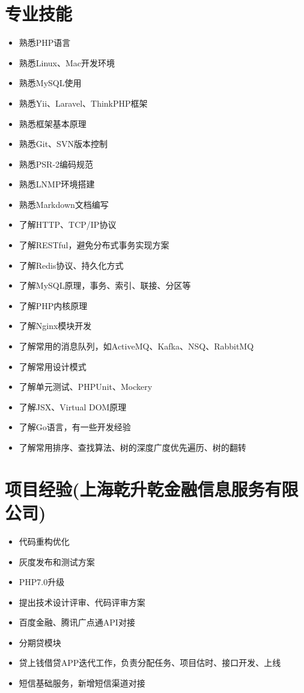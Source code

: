 \documentclass[a4paper,12pt]{article}
\begin{document}
\begin{CJK}{UTF8}{gbsn}
		\section{专业技能}
			\begin{itemize}
				\item{熟悉PHP语言}
				\item{熟悉Linux、Mac开发环境}
				\item{熟悉MySQL使用}
				\item{熟悉Yii、Laravel、ThinkPHP框架}
				\item{熟悉框架基本原理}
				\item{熟悉Git、SVN版本控制}
				\item{熟悉PSR-2编码规范}
				\item{熟悉LNMP环境搭建}
				\item{熟悉Markdown文档编写}
				\item{了解HTTP、TCP/IP协议}
				\item{了解RESTful，避免分布式事务实现方案}
				\item{了解Redis协议、持久化方式}
				\item{了解MySQL原理，事务、索引、联接、分区等}
				\item{了解PHP内核原理}
				\item{了解Nginx模块开发}
				\item{了解常用的消息队列，如ActiveMQ、Kafka、NSQ、RabbitMQ}
				\item{了解常用设计模式}
				\item{了解单元测试、PHPUnit、Mockery}
				\item{了解JSX、Virtual DOM原理}
				\item{了解Go语言，有一些开发经验}
				\item{了解常用排序、查找算法、树的深度广度优先遍历、树的翻转}
			\end{itemize}
		
		\section{项目经验(上海乾升乾金融信息服务有限公司)}
			\begin{itemize}
				\item{代码重构优化}
				\item{灰度发布和测试方案}
                			\item{PHP7.0升级}
                			\item{提出技术设计评审、代码评审方案} 
				\item{百度金融、腾讯广点通API对接}
				\item{分期贷模块}
				\item{贷上钱借贷APP迭代工作，负责分配任务、项目估时、接口开发、上线}
				\item{短信基础服务，新增短信渠道对接}
			\end{itemize}
			

\end{CJK}
\end{document}
